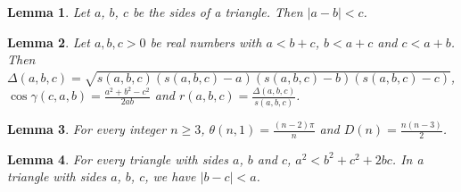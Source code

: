 \documentclass{article}
\newtheorem{lemma}{Lemma}
\begin{document}
\begin{lemma}\label{sides}
Let $a$, $b$, $c$ be the sides of a triangle. Then $|a-b|<c$.
\end{lemma}

\begin{lemma}\label{heron}
Let $a,b,c>0$ be real numbers with $a<b+c$, $b<a+c$ and $c<a+b$. Then $\Delta(a,b,c)=\sqrt{s(a,b,c)(s(a,b,c)-a)(s(a,b,c)-b)(s(a,b,c)-c)}$, $\cos\gamma(c,a,b)=\frac{a^2+b^2-c^2}{2ab}$ and $r(a,b,c)=\frac{\Delta(a,b,c)}{s(a,b,c)}$.
\end{lemma}

\begin{lemma}\label{polygon-closed}
For every integer $n\ge3$, $\theta(n,1)=\frac{(n-2)\pi}{n}$ and $D(n)=\frac{n(n-3)}{2}$.
\end{lemma}

\begin{lemma}\label{in-a-triangle}
For every triangle with sides $a$, $b$ and $c$, $a^2<b^2+c^2+2bc$. In a triangle with sides $a$, $b$, $c$, we have $|b-c|<a$.
\end{lemma}
\end{document}
